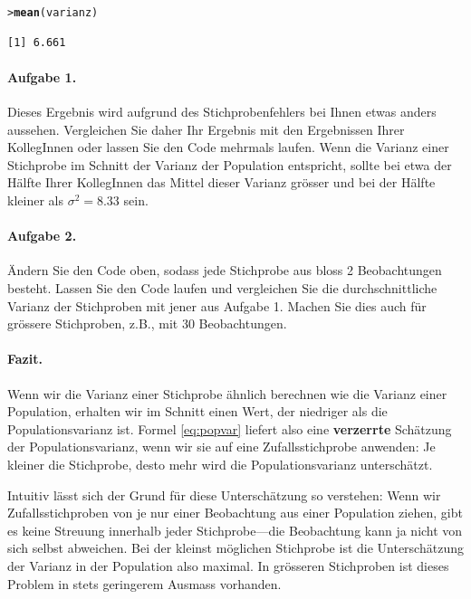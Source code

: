 \documentclass[oneside, 10pt]{book}\usepackage[]{graphicx}\usepackage[]{xcolor}
\makeatletter
\newcommand{\hlstd}[1]{\textcolor[rgb]{0.345,0.345,0.345}{#1}}%
\newcommand{\hlkwd}[1]{\textcolor[rgb]{0.737,0.353,0.396}{\textbf{#1}}}%
\newenvironment{kframe}{%
 \def\at@end@of@kframe{}%
 \ifinner\ifhmode%
  \def\at@end@of@kframe{\end{minipage}}%
  \begin{minipage}{\columnwidth}%
 \fi\fi%
 \def\FrameCommand##1{\hskip\@totalleftmargin \hskip-\fboxsep
 \colorbox{shadecolor}{##1}\hskip-\fboxsep
     \hskip-\linewidth \hskip-\@totalleftmargin \hskip\columnwidth}%
 \MakeFramed {\advance\hsize-\width
   \@totalleftmargin\z@ \linewidth\hsize
   \@setminipage}}%
 {\par\unskip\endMakeFramed%
 \at@end@of@kframe}
\newenvironment{knitrout}{}{} %
\makeatother
\begin{document}
\begin{knitrout}
\color{fgcolor}\begin{kframe}
\begin{alltt}
\hlstd{> }\hlkwd{mean}\hlstd{(varianz)}
\end{alltt}
\begin{verbatim}
[1] 6.661
\end{verbatim}
\end{kframe}
\end{knitrout}

\paragraph{Aufgabe 1.}
Dieses Ergebnis wird aufgrund des Stichprobenfehlers bei Ihnen
etwas anders aussehen. Vergleichen Sie daher Ihr Ergebnis mit
den Ergebnissen Ihrer KollegInnen
oder lassen Sie den Code mehrmals
laufen. Wenn die Varianz einer Stichprobe im Schnitt der
Varianz der Population entspricht, sollte bei etwa der Hälfte
Ihrer KollegInnen das Mittel dieser Varianz grösser
und bei der Hälfte kleiner als $\sigma^2 = 8.33$ sein.

\paragraph{Aufgabe 2.}
Ändern Sie den Code oben, sodass jede Stichprobe
aus bloss 2 Beobachtungen besteht. Lassen Sie den Code
laufen und vergleichen Sie die durchschnittliche Varianz
der Stichproben mit jener aus Aufgabe 1.
Machen Sie dies auch für grössere Stichproben, z.B.,
mit 30 Beobachtungen.

\paragraph{Fazit.}
Wenn wir die Varianz einer Stichprobe ähnlich berechnen
wie die Varianz einer Population, erhalten wir im Schnitt
einen Wert, der niedriger als die Populationsvarianz ist.
Formel \ref{eq:popvar} liefert also eine \textbf{verzerrte} Schätzung
der Populationsvarianz, wenn wir sie auf eine Zufallsstichprobe
anwenden:
Je kleiner die Stichprobe, desto mehr wird die Populationsvarianz
unterschätzt.

Intuitiv lässt sich der Grund für diese Unterschätzung so verstehen:
Wenn wir Zufallsstichproben von je nur einer Beobachtung aus einer
Population ziehen, gibt es keine Streuung innerhalb jeder Stichprobe---die
Beobachtung kann ja nicht von sich selbst abweichen.
Bei der kleinst möglichen Stichprobe ist die Unterschätzung
der Varianz in der Population also maximal. In grösseren Stichproben
ist dieses Problem in stets geringerem Ausmass vorhanden.
\end{document}
